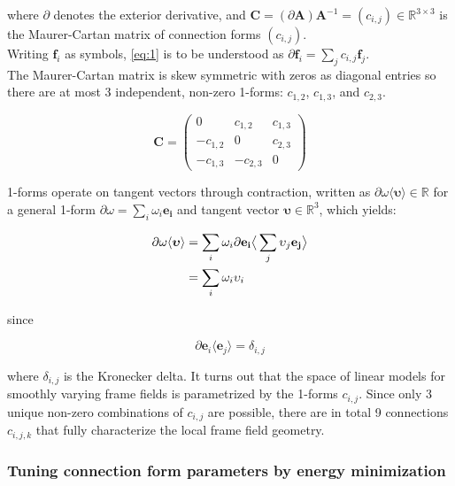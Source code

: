 where $\partial$ denotes the exterior derivative, and $\mathbf{C} = (\partial \mathbf{A}) \mathbf{A}^{-1} = (c_{i,j}) \in \mathbb{R}^{3 \times 3}$ is the Maurer-Cartan matrix of connection forms $(c_{i,j})$. \\
Writing $\mathbf{f}_i$ as symbols, \ref{eq:1} is to be understood as $\partial \mathbf{f}_i = \sum_j{c_{i,j}\mathbf{f}_j}$. \\
The Maurer-Cartan matrix is skew symmetric with zeros as diagonal entries so there are at most 3 independent, non-zero 1-forms: $c_{1,2}$, $c_{1,3}$, and $c_{2,3}$.

\begin{equation}
    \mathbf{C} = \begin{pmatrix}
    0 & c_{1,2} & c_{1,3} \\
    -c_{1,2} & 0 & c_{2,3} \\
    -c_{1,3} & -c_{2,3} & 0
    \end{pmatrix}
\end{equation}

1-forms operate on tangent vectors through contraction, written as $\partial \omega \langle \boldsymbol{\upsilon} \rangle \in \mathbb{R}$ for a general 1-form $\partial \omega = \sum_i{\omega_i \mathbf{e_i}}$ and tangent vector $\boldsymbol{\upsilon} \in \mathbb{R}^3$, which yields:

\begin{align}
    \partial \omega \langle \boldsymbol{\upsilon} \rangle &= \sum_i{\omega_i \partial \mathbf{e_i}} \big{\langle} \sum_j{\upsilon_j \mathbf{e_j}} \big{\rangle} \\
    &= \sum_i{\omega_i \upsilon_i}
\end{align}

since

\begin{equation}
    \partial \mathbf{e}_i \langle \mathbf{e}_j \rangle = \delta_{i,j}
\end{equation}

where $\delta_{i,j}$ is the Kronecker delta.
It turns out that the space of linear models for smoothly varying frame fields is parametrized by the 1-forms $c_{i,j}$. Since only 3 unique non-zero combinations of $c_{i,j}$ are possible, there are in total 9 connections $c_{i,j,k}$ that fully characterize the local frame field geometry.

\subsubsection{Tuning connection form parameters by energy minimization} \label{fitting_method}


